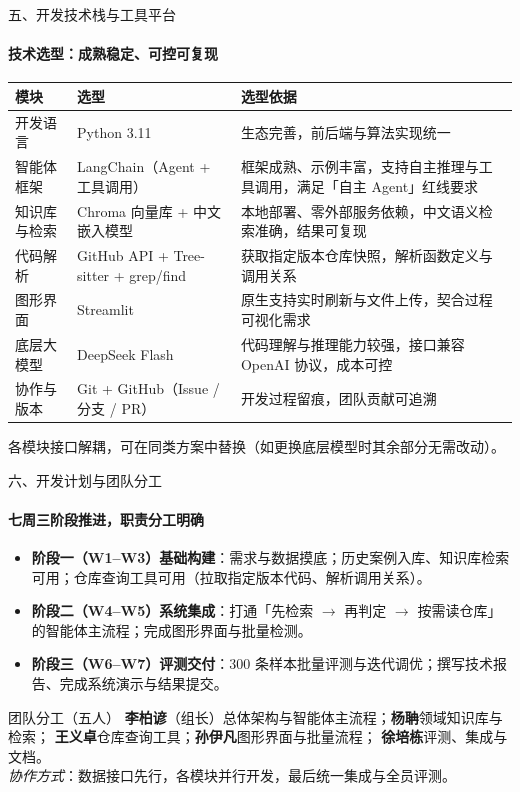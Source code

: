 \documentclass{beamer}
\begin{document}
\begin{frame}{五、开发技术栈与工具平台}
\framesubtitle{技术选型：成熟稳定、可控可复现}
\centering
\footnotesize
\renewcommand{\arraystretch}{1.0}
\begin{tabular}{@{}p{}p{}p{}@{}}
\toprule
\textbf{模块} & \textbf{选型} & \textbf{选型依据} \\
\midrule
开发语言 & Python 3.11 & 生态完善，前后端与算法实现统一 \\
智能体框架 & LangChain（Agent + 工具调用） & 框架成熟、示例丰富，支持自主推理与工具调用，满足「自主 Agent」红线要求 \\
知识库与检索 & Chroma 向量库 + 中文嵌入模型 & 本地部署、零外部服务依赖，中文语义检索准确，结果可复现 \\
代码解析 & GitHub API + Tree-sitter + grep/find & 获取指定版本仓库快照，解析函数定义与调用关系 \\
图形界面 & Streamlit & 原生支持实时刷新与文件上传，契合过程可视化需求 \\
底层大模型 & DeepSeek Flash & 代码理解与推理能力较强，接口兼容 OpenAI 协议，成本可控 \\
协作与版本 & Git + GitHub（Issue / 分支 / PR） & 开发过程留痕，团队贡献可追溯 \\
\bottomrule
\end{tabular}
\vspace{0.3em}

{\footnotesize 各模块接口解耦，可在同类方案中替换（如更换底层模型时其余部分无需改动）。}
\end{frame}

\begin{frame}{六、开发计划与团队分工}
\framesubtitle{七周三阶段推进，职责分工明确}
\small
\begin{itemize}
\item \textbf{阶段一（W1--W3）基础构建}：需求与数据摸底；历史案例入库、知识库检索可用；仓库查询工具可用（拉取指定版本代码、解析调用关系）。
\item \textbf{阶段二（W4--W5）系统集成}：打通「先检索 $\rightarrow$ 再判定 $\rightarrow$ 按需读仓库」的智能体主流程；完成图形界面与批量检测。
\item \textbf{阶段三（W6--W7）评测交付}：300 条样本批量评测与迭代调优；撰写技术报告、完成系统演示与结果提交。
\end{itemize}
\vspace{0.2em}
\begin{block}{团队分工（五人）}
\textbf{李柏谚}（组长）总体架构与智能体主流程；\textbf{杨聃}领域知识库与检索；
\textbf{王义卓}仓库查询工具；\textbf{孙伊凡}图形界面与批量流程；
\textbf{徐培栋}评测、集成与文档。\\
\emph{协作方式}：数据接口先行，各模块并行开发，最后统一集成与全员评测。
\end{block}
\end{frame}
\end{document}
